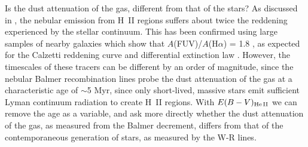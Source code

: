 \documentclass[]{aastex63}
\begin{document}

Is the dust attenuation of the gas, different from that of the stars?  As discussed in \citet{calzetti_dust_1994}, the nebular emission from H~II regions suffers about twice the reddening experienced by the stellar continuum.  This has been confirmed using large samples of nearby galaxies which show that $A$(FUV)/$A$(H$\alpha$) = 1.8 \citep[e.g.,][]{lee_comparison_2009}, as expected for the Calzetti reddening curve and differential extinction law \citep{calzetti_dust_2001}. However, the timescales of these tracers can be different by an order of magnitude, since the nebular Balmer recombination lines probe the dust attenuation of the gas at a characteristic age of $\sim$5 Myr, since only short-lived, massive stars emit sufficient Lyman continuum radiation to create H~II regions.  With ${E(B-V)_{\rm He\,II}}$ we can remove the age as a variable, and ask more directly whether the dust attenuation of the gas, as measured from the Balmer decrement, differs from that of the contemporaneous generation of stars, as measured by the W-R lines.
\end{document}
